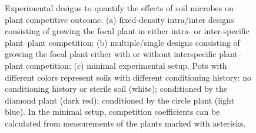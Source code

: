 \clearpage
\begin{figure}[h!]
	\centering
	\caption[Experimental designs to quantify the effects of soil microbes on plant competitive outcome.]
		{\hspace{1mm}Experimental designs to quantify the effects of soil microbes on plant competitive outcome. (a) fixed-density intra/inter designs consisting of growing the focal plant in either intra- or inter-specific plant--plant competition; (b) multiple/single designs consisting of growing the focal plant either with or without interspecific plant--plant competition; (c) minimal experimental setup. Pots with different colors represent soils with different conditioning history: no conditioning history or sterile soil (white); conditioned by the diamond plant (dark red); conditioned by the circle plant (light blue). In the minimal setup, competition coefficients can be calculated from measurements of the plants marked with asterisks.}
	\label{fig:ExperimentSetup}
\end{figure}



